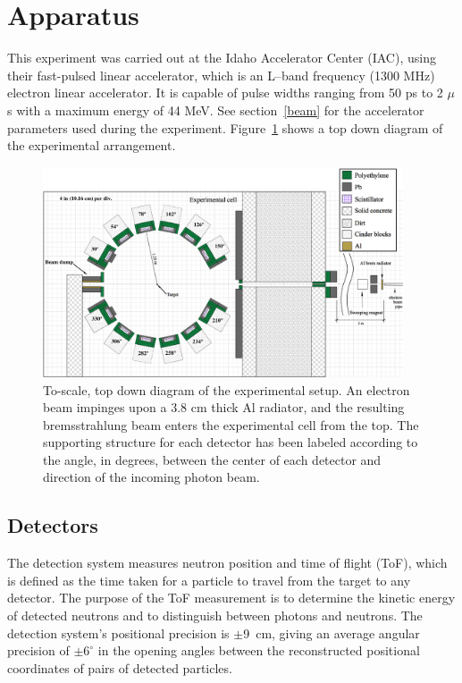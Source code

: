 
\section{Apparatus}
This experiment was carried out at the Idaho Accelerator Center (IAC), using their fast-pulsed linear accelerator, which is an L--band frequency (1300 MHz) electron linear accelerator.
It is capable of pulse widths ranging from 50 ps to 2 $\mu$s with a maximum energy of 44 MeV.
See section~\ref{beam} for the accelerator parameters used during the experiment.
Figure~\ref{fig:Facility} shows a top down diagram of the experimental arrangement.

\begin{figure}[h]
\centering
\includegraphics[width=0.95\textwidth]{Content/Methods/ExpArangment.jpg}
\caption{To-scale, top down diagram of the experimental setup.
An electron beam impinges upon a 3.8 cm thick Al radiator, and the resulting bremsstrahlung beam enters the experimental cell from the top.
The supporting structure for each detector has been labeled according to the angle, in degrees, between the center of each detector and direction of the incoming photon beam.
}
\label{fig:Facility}
\end{figure}
\subsection{Detectors}
\label{subsection:detectors}
The detection system measures neutron position and time of flight (ToF), which is defined as the time taken for a particle to travel from the target to any detector.
The purpose of the ToF measurement is to determine the kinetic energy of detected neutrons and to distinguish between photons and neutrons.
The detection system's positional precision is $\pm$9~cm, giving an average angular precision of $\pm6^{\circ}$ in the opening angles between the reconstructed positional coordinates of pairs of detected particles.

